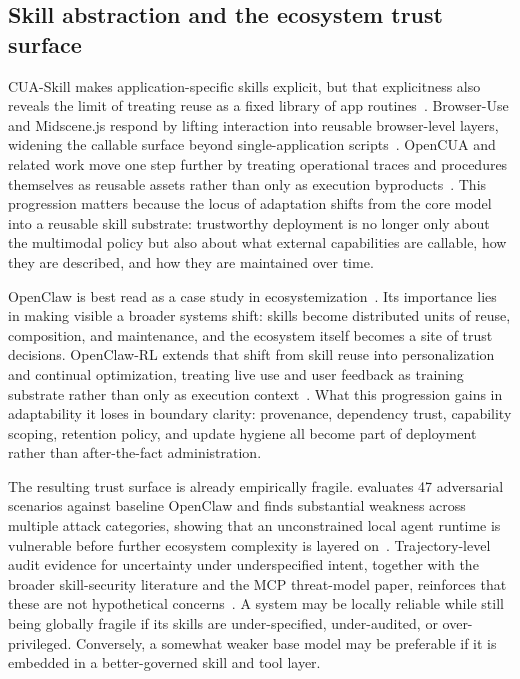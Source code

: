 \subsection{Skill abstraction and the ecosystem trust surface}

CUA-Skill makes application-specific skills explicit, but that explicitness also reveals the limit of treating reuse as a fixed library of app routines~\cite{cuaskill2026}. Browser-Use and Midscene.js respond by lifting interaction into reusable browser-level layers, widening the callable surface beyond single-application scripts~\cite{browseruse2025,midscene2025}. OpenCUA and related work move one step further by treating operational traces and procedures themselves as reusable assets rather than only as execution byproducts~\cite{opencua2025}. This progression matters because the locus of adaptation shifts from the core model into a reusable skill substrate: trustworthy deployment is no longer only about the multimodal policy but also about what external capabilities are callable, how they are described, and how they are maintained over time.

OpenClaw is best read as a case study in ecosystemization~\cite{openclaw2026}. Its importance lies in making visible a broader systems shift: skills become distributed units of reuse, composition, and maintenance, and the ecosystem itself becomes a site of trust decisions. OpenClaw-RL extends that shift from skill reuse into personalization and continual optimization, treating live use and user feedback as training substrate rather than only as execution context~\cite{openclawrl2026}. What this progression gains in adaptability it loses in boundary clarity: provenance, dependency trust, capability scoping, retention policy, and update hygiene all become part of deployment rather than after-the-fact administration.

The resulting trust surface is already empirically fragile. \cite{shan2026dontletclawgrip} evaluates 47 adversarial scenarios against baseline OpenClaw and finds substantial weakness across multiple attack categories, showing that an unconstrained local agent runtime is vulnerable before further ecosystem complexity is layered on~\cite{shan2026dontletclawgrip}. Trajectory-level audit evidence for uncertainty under underspecified intent, together with the broader skill-security literature and the MCP threat-model paper, reinforces that these are not hypothetical concerns~\cite{clawaudit2026,skillsecurity2026,hou2025mcp}. A system may be locally reliable while still being globally fragile if its skills are under-specified, under-audited, or over-privileged. Conversely, a somewhat weaker base model may be preferable if it is embedded in a better-governed skill and tool layer.


